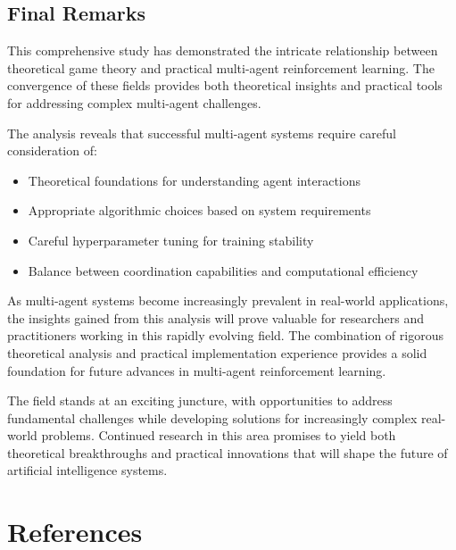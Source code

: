 \documentclass[conference]{IEEEtran}
\begin{document}
{{\subsection{Final Remarks}

This comprehensive study has demonstrated the intricate relationship between theoretical game theory and practical multi-agent reinforcement learning. The convergence of these fields provides both theoretical insights and practical tools for addressing complex multi-agent challenges.

The analysis reveals that successful multi-agent systems require careful consideration of:
\begin{itemize}
    \item Theoretical foundations for understanding agent interactions
    \item Appropriate algorithmic choices based on system requirements
    \item Careful hyperparameter tuning for training stability
    \item Balance between coordination capabilities and computational efficiency
\end{itemize}

As multi-agent systems become increasingly prevalent in real-world applications, the insights gained from this analysis will prove valuable for researchers and practitioners working in this rapidly evolving field. The combination of rigorous theoretical analysis and practical implementation experience provides a solid foundation for future advances in multi-agent reinforcement learning.

The field stands at an exciting juncture, with opportunities to address fundamental challenges while developing solutions for increasingly complex real-world problems. Continued research in this area promises to yield both theoretical breakthroughs and practical innovations that will shape the future of artificial intelligence systems.

}}



\section*{References}
\end{document}
